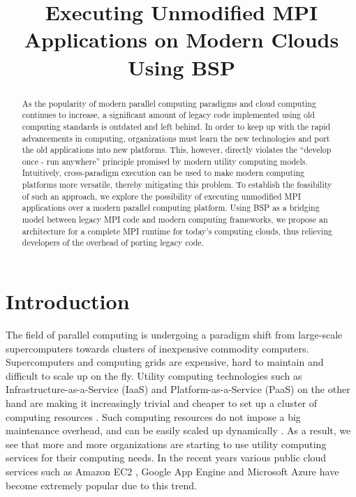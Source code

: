 \documentclass[conference,10pt] {IEEEtran}
\begin{document}
\title{Executing Unmodified MPI Applications on Modern Clouds Using BSP}
\author{
}
\maketitle

\begin{abstract}
As the popularity of modern parallel computing paradigms and cloud computing continues to increase, a significant amount of legacy code implemented using old computing standards is outdated and left behind. In order to keep up with the rapid advancements in computing, organizations must learn the new technologies and port the old applications into new platforms. This, however, directly violates the ``develop once - run anywhere'' principle promised by modern utility computing models. Intuitively, cross-paradigm execution can be used to make modern computing platforms more versatile, thereby mitigating this problem. To establish the feasibility of such an approach, we explore the possibility of executing unmodified MPI applications over a modern parallel computing platform. Using BSP as a bridging model between legacy MPI code and modern computing frameworks, we propose an architecture for a complete MPI runtime for today's computing clouds, thus relieving developers of the overhead of porting legacy code.
\end{abstract}

\section{Introduction}
\label{sec:intro}
The field of parallel computing is undergoing a paradigm shift from large-scale supercomputers towards clusters of inexpensive commodity computers. Supercomputers and computing grids are expensive, hard to maintain and difficult to scale up on the fly. Utility computing technologies such as Infrastructure-as-a-Service (IaaS) and Platform-as-a-Service (PaaS) on the other hand are making it increasingly trivial and cheaper to set up a cluster of computing resources \cite{Degabriele:2007:EAU:1386610.1386645,Wang:2009:CMH:1646468.1646475}. Such computing resources do not impose a big maintenance overhead, and can be easily scaled up dynamically \cite{Ghanbari:2012:OAI:2371536.2371567,Brebner:2012:YCE:2188286.2188334}. As a result, we see that more and more organizations are starting to use utility computing services for their computing needs. In the recent years various public cloud services such as Amazon EC2 \cite{url:ec2}, Google App Engine \cite{url:gae} and Microsoft Azure \cite{url:azure} have become extremely popular due to this trend. 
\end{document}
